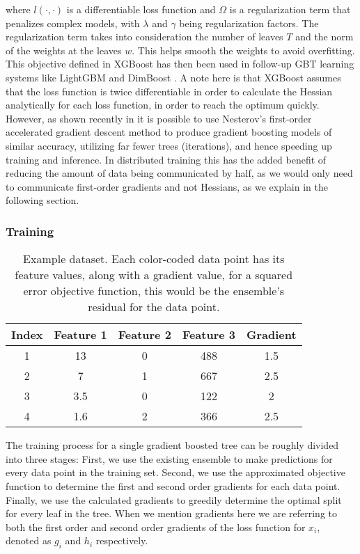 \noindent
where $l(\cdot, \cdot)$ is a differentiable loss function and $\Omega$ is a regularization term
that penalizes complex models, with $\lambda$ and $\gamma$ being regularization factors. The regularization term takes into consideration
the number of leaves $T$ and the norm of the weights at the leaves $w$. This helps
smooth the weights to avoid overfitting. This objective defined in XGBoost
has then been used in follow-up GBT learning systems like LightGBM and
DimBoost \cite{lightgbm, dimboost}.  A note here is that XGBoost
assumes that the loss function is twice differentiable in order
to calculate the Hessian analytically for each loss function,
in order to reach the optimum quickly.
However, as shown recently in \cite{accelerated-gb, accelerated-gbm} it is possible
to use Nesterov's first-order accelerated gradient descent method
\cite{nesterov-book} to produce gradient boosting models of similar
accuracy, utilizing far fewer trees (iterations), and hence speeding up training
and inference.
In distributed training this has the added benefit of reducing
the amount of data being communicated by half, as we would only need to
communicate first-order gradients and not Hessians, as we explain
in the following section.



\subsubsection*{Training}

\begin{table}
	\centering
	\begin{tabular}{cccc|c}
		\toprule
		Index & Feature 1 & Feature 2 & Feature 3 & Gradient \\
		\midrule
		\rowcolor{CBOne}
		1 & 13 & 0 & 488 & 1.5 \\
		\rowcolor{CBTwo}
		2 & 7 & 1 & 667 & 2.5 \\
		\rowcolor{CBThree}
		3 & 3.5 & 0 & 122 & 2 \\
		\rowcolor{CBFour}
		4 & 1.6 & 2 & 366 & 2.5 \\
		\bottomrule
	\end{tabular}
	\caption{Example dataset. Each color-coded data point has its feature values, along
	with a gradient value, for a squared error objective function, this would be the ensemble's
	residual for the data point.}
	\label{tab:example-data}
\end{table}


The training process for a single gradient boosted tree can be roughly divided into three stages:
First, we use the existing ensemble to make predictions for every data point in the training
set. Second, we use the approximated objective function to determine the first and second order
gradients for each data point. Finally, we use the calculated gradients to greedily determine
the optimal split for every leaf in the tree. When we mention gradients here we are referring
to both the first order and second order gradients of the loss function for $x_i$, denoted as $g_i$ and $h_i$
respectively.


